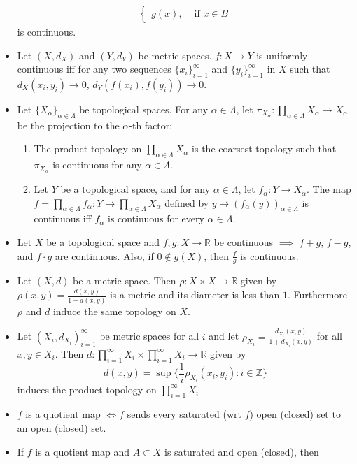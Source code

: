 \documentclass[frenchspacing,9pt,landscape,a4paper]{article}
\newcommand{\BR}{\mathbb R}
\newcommand{\BZ}{\mathbb Z}
\theoremstyle{remark}
\begin{document}
\begin{multicols}{4}
\begin{itemize}
\begin{align*}
\begin{cases}
            g(x), & \text{ if } x\in B
        \end{cases}
    \end{align*} is continuous.
    \item Let $(X,d_X)$ and  $(Y,d_Y)$ be metric spaces. $f:X\to Y$ is uniformly continuous iff for any
        two sequences  $\{x_i\}_{i=1}^\infty$ and  $\{y_i\}_{i=1}^\infty$ in  $X$ such that  $d_X(x_i,y_i)\to
        0$, $d_Y(f(x_i),f(y_i))\to 0$.
    \item Let $\{X_{\alpha}\}_{\alpha\in\Lambda}$ be topological spaces. For any  $\alpha\in\Lambda$, let
    $\pi_{X_\alpha}:\prod_{\alpha\in\Lambda}X_\alpha\to X_\alpha$ be the projection to the  $\alpha$-th
    factor:
     \begin{enumerate}
         \item The product topology on $\prod_{\alpha\in\Lambda}X_\alpha$ is the coarsest topology such
             that  $\pi_{X_\alpha}$ is continuous for any  $\alpha\in\Lambda$.
         \item Let  $Y$ be a topological space, and for any  $\alpha\in\Lambda$, let  $f_\alpha:Y\to
             X_\alpha$. The map  $f=\prod_{\alpha\in\Lambda} f_\alpha:Y\to\prod_{\alpha\in\Lambda}X_\alpha$
             defined by  $y\mapsto(f_\alpha(y))_{\alpha\in\Lambda}$ is continuous iff  $f_\alpha$ is
             continuous for every  $\alpha\in\Lambda$.
    \end{enumerate}
\item Let $X$ be a topological space and  $f,g:X\to\BR$ be continuous $\implies$ $f+g$,  $f-g$, and  $f\cdot g$
    are continuous. Also, if  $0\notin g(X)$, then  $\frac{f}{g}$ is continuous.
\item Let $(X,d)$ be a metric space. Then  $\rho:X\times X\to\BR$ given by
    $\rho(x,y)=\frac{d(x,y)}{1+d(x,y)}$ is a metric and its diameter is less than $1$. Furthermore  $\rho$
    and  $d$ induce the same topology on  $X$.
\item Let $(X_i,d_{X_i})_{i=1}^\infty$ be metric spaces for all  $i$ and let
    $\rho_{X_i}=\frac{d_{X_i}(x,y)}{1+d_{X_i}(x,y)}$ for all $x,y\in X_i$. Then  $d:\prod_{i=1}^\infty
    X_i\times\prod_{i=1}^\infty X_i\to\BR$ given by
    \[d(x,y)=\sup\{\frac{1}{i}\rho_{X_i}(x_i,y_i):i\in\BZ\}\] induces the product topology on
    $\prod_{i=1}^\infty X_i$
  \item $f$ is a quotient map  $\iff f$ sends every saturated (wrt $f$) open (closed) set to an open
             (closed) set.
         \item If $f$ is a quotient map and  $A\subset X$ is saturated and open (closed), then

\end{itemize}
\end{multicols}
\end{document}
